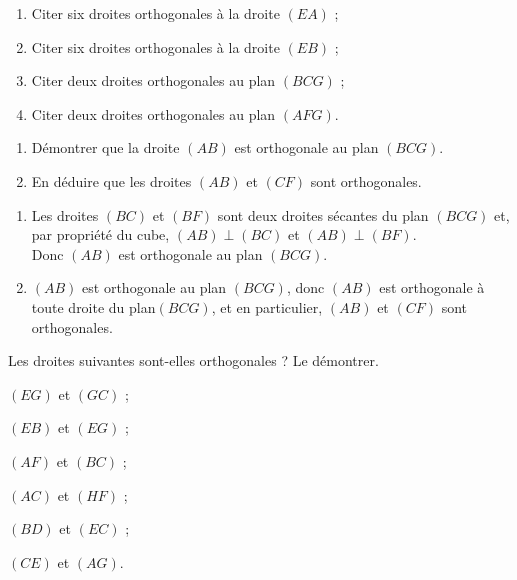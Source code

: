 \begin{colonne*exercice}
\begin{exercice}
  \begin{enumerate}
  \item Citer six droites orthogonales à la droite $(EA)$ ;
  \item Citer six droites orthogonales à la droite $(EB)$ ;
  \item Citer deux droites orthogonales au plan $(BCG)$ ;
  \item Citer deux droites orthogonales au plan $(AFG)$.
  \end{enumerate}
\end{exercice}

\begin{exercice*}\label{G2Exo34}
  \begin{enumerate}
  \item Démontrer que la droite $(AB)$ est orthogonale au plan
    $(BCG)$.
  \item En déduire que les droites $(AB)$ et $(CF)$ sont orthogonales.
  \end{enumerate}
\end{exercice*}
\begin{corrige}
  \begin{enumerate}
\item  Les droites $(BC)$ et $(BF)$ sont deux droites sécantes du plan $(BCG)$ et, par propriété du cube, $(AB)\perp(BC)$ et $(AB)\perp(BF)$.\\
Donc $(AB)$ est orthogonale au plan $(BCG)$.
\item  $(AB)$ est orthogonale au plan $(BCG)$, donc $(AB)$ est orthogonale à toute droite du plan$(BCG)$, et en particulier, $(AB)$ et $(CF)$ sont orthogonales.
\end{enumerate}
\end{corrige}

\begin{exercice}
  Les droites suivantes sont-elles orthogonales ? Le démontrer.
  \begin{colenumerate}{2}
  \item $(EG)$ et $(GC)$ ;
  \item $(EB)$ et $(EG)$ ;
  \item $(AF)$ et $(BC)$ ;
  \item $(AC)$ et $(HF)$ ;
  \item $(BD)$ et $(EC)$ ;
  \item $(CE)$ et $(AG)$.
  \end{colenumerate}
\end{exercice}


\end{colonne*exercice}
